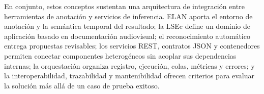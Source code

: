 En conjunto, estos conceptos sustentan una arquitectura de integración entre herramientas de anotación y servicios de inferencia. ELAN aporta el entorno de anotación y la semántica temporal del resultado; la LSEc define un dominio de aplicación basado en documentación audiovisual; el reconocimiento automático entrega propuestas revisables; los servicios REST, contratos JSON y contenedores permiten conectar componentes heterogéneos sin acoplar sus dependencias internas; la orquestación organiza registro, ejecución, colas, métricas y errores; y la interoperabilidad, trazabilidad y mantenibilidad ofrecen criterios para evaluar la solución más allá de un caso de prueba exitoso.
\vspace{1\baselineskip}